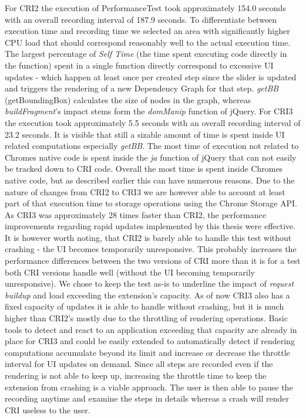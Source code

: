 	For CRI2 the execution of PerformanceTest took approximately 154.0 seconds with an overall recording interval of 187.9 seconds. To differentiate between execution time and recording time we selected an area with significantly higher CPU load that should correspond reasonably well to the actual execution time. The largest percentage of \emph{Self Time} (the time spent executing code directly in the function) spent in a single function directly correspond to excessive UI updates - which happen at least once per created step since the slider is updated and triggers the rendering of a new Dependency Graph for that step. \emph{getBB} (getBoundingBox) calculates the size of nodes in the graph, whereas  \emph{buildFragment}'s impact stems form the \emph{domManip} function of jQuery.
	For CRI3 the execution took approximately 5.5 seconds with an overall recording interval of 23.2 seconds. It is visible that still a sizable amount of time is spent inside UI related computations especially \emph{getBB}. The most time of execution not related to Chromes native code is spent inside the \emph{ja} function of jQuery that can not easily be tracked down to CRI code. Overall the most time is spent inside Chromes native code, but as described earlier this can have numerous reasons. Due to the nature of changes from CRI2 to CRI3 we are however able to account at least part of that execution time to storage operations using the Chrome Storage API. 
	As CRI3 was approximately 28 times faster than CRI2, the performance improvements regarding rapid updates implemented by this thesis were effective. It is however worth noting, that CRI2 is barely able to handle this test without crashing - the UI becomes temporarily unresponsive. This probably increases the performance differences between the two versions of CRI more than it is for a test both CRI versions handle well (without the UI becoming temporarily unresponsive). We chose to keep the test as-is to underline the impact of \emph{request buildup} and load exceeding the extension's capacity. 
	As of now CRI3 also has a fixed capacity of updates it is able to handle without crashing, but it is much higher than CRI2's mostly due to the throttling of rendering operations. Basic tools to detect and react to an application exceeding that capacity are already in place for CRI3 and could be easily extended to automatically detect if rendering computations accumulate beyond its limit and increase or decrease the throttle interval for UI updates on demand. Since all steps are recorded even if the rendering is not able to keep up, increasing the throttle time to keep the extension from crashing is a viable approach. The user is then able to pause the recording anytime and examine the steps in details whereas a crash will render CRI useless to the user.
	

